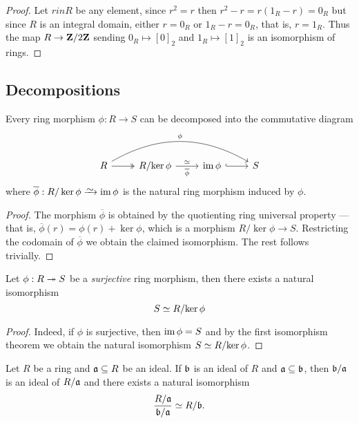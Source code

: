 \begin{proof}
Let \(r in R\) be any element, since \(r^2 = r\) then
\(r^2 - r = r(1_R - r) = 0_R\) but since \(R\) is an integral domain, either
\(r = 0_R\) or \(1_R - r = 0_R\), that is, \(r = 1_R\). Thus the map
\(R \to \mathbf{Z}/2\mathbf{Z}\) sending \(0_R \mapsto [0]_2\) and \(1_R \mapsto [1]_2\) is an
isomorphism of rings.
\end{proof}

\subsection{Decompositions}

\begin{theorem}
\label{thm:ring-first-isomorphism}
Every ring morphism \(\phi: R \to S\) can be decomposed into the commutative
diagram
\[
\begin{tikzcd}
R \ar[r, two heads] \ar[rrr, bend left, "\phi"]
&R/{\ker \phi} \ar[r, "\dis", "\overline{\phi}"']
&\im \phi \ar[r, hook]
&S
\end{tikzcd}
\]
where \(\overline{\phi}: R/\ker \phi \isoto \im \phi\) is the natural ring
morphism induced by \(\phi\).
\end{theorem}

\begin{proof}
The morphism \(\overline{\phi}\) is obtained by the quotienting ring universal
property --- that is, \(\overline{\phi}(r) = \phi(r) + \ker \phi\), which is a
morphism \(R/{\ker \phi} \to S\). Restricting the codomain of
\(\overline{\phi}\) we obtain the claimed isomorphism. The rest follows
trivially.
\end{proof}

\begin{corollary}
\label{cor:isomorphism-quotient-by-kernel-of-surjective-morphism}
Let \(\phi: R \twoheadrightarrow S\) be a \emph{surjective} ring morphism, then there exists
a natural isomorphism
\[
S \simeq R/{\ker \phi}
\]
\end{corollary}

\begin{proof}
Indeed, if \(\phi\) is surjective, then \(\operatorname{im} \phi = S\) and by the first
isomorphism theorem we obtain the natural isomorphism \(S \simeq R/{\ker \phi}\).
\end{proof}

\begin{proposition}
\label{prop:ideal-of-a-quotient}
Let \(R\) be a ring and \(\mathfrak{a} \subseteq R\) be an ideal. If \(\mathfrak{b}\)
is an ideal of \(R\) and \(\mathfrak{a} \subseteq \mathfrak{b}\), then
\(\mathfrak{b}/\mathfrak{a}\) is an ideal of \(R/\mathfrak{a}\) and there exists a
natural isomorphism
\[
\frac{R/\mathfrak{a}}{\mathfrak{b}/\mathfrak{a}} \simeq R/\mathfrak{b}.
\]
\end{proposition}

